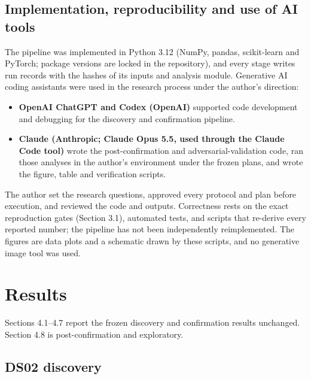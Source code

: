 \documentclass[preprint,11pt,a4paper]{elsarticle}
\begin{document}
\subsection{Implementation, reproducibility and use of AI tools}

The pipeline was implemented in Python 3.12 (NumPy, pandas, scikit-learn and PyTorch; package versions are locked in the repository), and every stage writes run records with the hashes of its inputs and analysis module. Generative AI coding assistants were used in the research process under the author's direction:
\begin{itemize}
\item \textbf{OpenAI ChatGPT and Codex (OpenAI)} supported code development and debugging for the discovery and confirmation pipeline.
\item \textbf{Claude (Anthropic; Claude Opus 5.5, used through the Claude Code tool)} wrote the post-confirmation and adversarial-validation code, ran those analyses in the author's environment under the frozen plans, and wrote the figure, table and verification scripts.
\end{itemize}

The author set the research questions, approved every protocol and plan before execution, and reviewed the code and outputs. Correctness rests on the exact reproduction gates (Section 3.1), automated tests, and scripts that re-derive every reported number; the pipeline has not been independently reimplemented. The figures are data plots and a schematic drawn by these scripts, and no generative image tool was used.

\section{Results}

Sections 4.1–4.7 report the frozen discovery and confirmation results unchanged. Section 4.8 is post-confirmation and exploratory.

\subsection{DS02 discovery}
\end{document}
